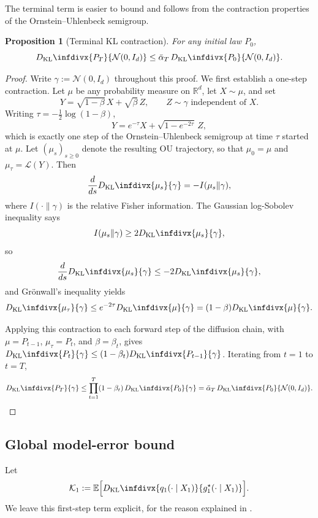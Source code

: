 \documentclass[11pt]{article}
\def\E{\mathbb{E}}
\def\R{\mathbb{R}}
\newcommand{\kl}{D_{\mathrm{KL}}\infdivx}
\newcommand{\Law}{\mathcal{L}}
\newtheorem{prop}{Proposition}
\begin{document}
The terminal term is easier to bound and follows from the contraction properties of the Ornstein--Uhlenbeck semigroup.

\begin{prop}[Terminal KL contraction]
\label{prop:terminal_kl}
For any initial law \(P_0\),
\[
\kl{P_T}{\mathcal N(0,I_d)}
\le
\bar\alpha_T\,\kl{P_0}{\mathcal N(0,I_d)}.
\]
\end{prop}

\begin{proof}
Write \(\gamma:=\mathcal N(0,I_d)\) throughout this proof. We first establish a one-step contraction. Let \(\mu\) be any probability measure on \(\R^d\), let \(X\sim\mu\), and set
\[
Y = \sqrt{1-\beta}\,X + \sqrt{\beta}\,Z,
\qquad Z\sim\gamma \text{ independent of } X.
\]
Writing \(\tau=-\tfrac12\log(1-\beta)\),
\[
Y = e^{-\tau}X + \sqrt{1-e^{-2\tau}}\,Z,
\]
which is exactly one step of the Ornstein--Uhlenbeck semigroup at time \(\tau\) started at \(\mu\). Let \((\mu_s)_{s\ge 0}\) denote the resulting OU trajectory, so that \(\mu_0=\mu\) and \(\mu_\tau=\Law(Y)\). Then
\[
\frac{d}{ds}\kl{\mu_s}{\gamma} = -I(\mu_s\|\gamma),
\]
where \(I(\cdot\|\gamma)\) is the relative Fisher information. The Gaussian log-Sobolev inequality \cite[Prop.~5.5.1]{bakry2014analysis} says
\[
I(\mu_s\|\gamma)\ge 2\kl{\mu_s}{\gamma},
\]
so
\[
\frac{d}{ds}\kl{\mu_s}{\gamma}\le -2\kl{\mu_s}{\gamma},
\]
and Gr\"onwall's inequality yields
\[
\kl{\mu_\tau}{\gamma}\le e^{-2\tau}\kl{\mu}{\gamma}=(1-\beta)\kl{\mu}{\gamma}. 
\]

Applying this contraction to each forward step of the diffusion chain, with \(\mu=P_{t-1}\), \(\mu_\tau=P_t\), and \(\beta=\beta_t\), gives \(\kl{P_t}{\gamma}\le (1-\beta_t)\kl{P_{t-1}}{\gamma}\). Iterating from \(t=1\) to \(t=T\),
\[
\kl{P_T}{\gamma}
\le
\prod_{t=1}^T (1-\beta_t)\,\kl{P_0}{\gamma}
=
\bar\alpha_T\,\kl{P_0}{\mathcal N(0,I_d)}.
\]
\end{proof}

\subsection{Global model-error bound}

Let
\[
\mathcal K_1
:=
\E\Big[
\kl{q_1(\cdot\mid X_1)}{g_1^\star(\cdot\mid X_1)}
\Big].
\]
We leave this first-step term explicit, for the reason explained in . 
\end{document}
